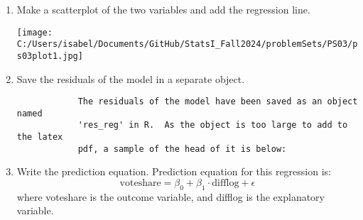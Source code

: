 \documentclass[12pt,letterpaper]{article}
\begin{document}
\begin{enumerate}
\begin{table}[!htbp]
		\end{table} 
		\vspace{7cm}
		\item Make a scatterplot of the two variables and add the regression line. 	\vspace{0.1cm}
		  
		\vspace{0.1cm}
		\texttt{[image: C:/Users/isabel/Documents/GitHub/StatsI\_Fall2024/problemSets/PS03/ps03plot1.jpg]}
		\vspace{0.1cm}
		\item Save the residuals of the model in a separate object.	\vspace{0.1cm}
		  
		\begin{verbatim}
			The residuals of the model have been saved as an object named 
			'res_reg' in R.  As the object is too large to add to the latex 
			pdf, a sample of the head of it is below:
		\end{verbatim}
		\vspace{0.1cm}
		
		\item Write the prediction equation.  
		\vspace{0.1cm}
		\text Prediction equation for this regression is:
		\[
		\text{voteshare} = \beta_0 + \beta_1 \cdot \text{difflog} + \epsilon
		\]
		\text where voteshare is the outcome variable, and difflog is the explanatory variable.
		\vspace{5cm}
	\end{enumerate}
	
\newpage
\end{document}
